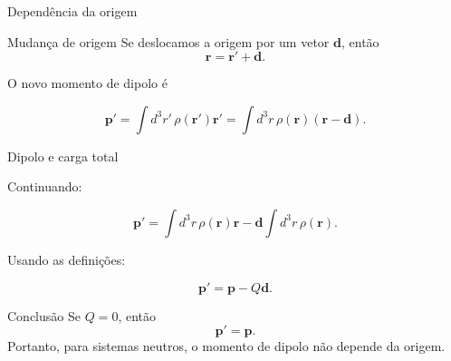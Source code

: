\documentclass[aspectratio=169]{beamer}
\begin{document}
\begin{frame}{Dependência da origem}

\begin{mybox}{Mudança de origem}
Se deslocamos a origem por um vetor \(\mathbf d\), então
\[
\mathbf r = \mathbf r' + \mathbf d.
\]
\end{mybox}

O novo momento de dipolo é

\begin{eqbox}
\begin{equation}
\mathbf p'
=
\int d^3r'\,\rho(\mathbf r')\mathbf r'
=
\int d^3r\,\rho(\mathbf r)(\mathbf r-\mathbf d).
\label{eq:dipolo_origem_1}
\end{equation}
\end{eqbox}

\end{frame}

\begin{frame}{Dipolo e carga total}

Continuando:

\begin{eqbox}
\begin{equation}
\mathbf p'
=
\int d^3r\,\rho(\mathbf r)\mathbf r
-
\mathbf d
\int d^3r\,\rho(\mathbf r).
\label{eq:dipolo_origem_2}
\end{equation}
\end{eqbox}

Usando as definições:

\begin{eqbox}
\begin{equation}
\mathbf p'
=
\mathbf p
-
Q\mathbf d.
\tag{4.9}
\label{eq:dipolo_origem_final}
\end{equation}
\end{eqbox}

\begin{mybox}{Conclusão}
Se \(Q=0\), então
\[
\mathbf p'=\mathbf p.
\]
Portanto, para sistemas neutros, o momento de dipolo não depende da origem.
\end{mybox}

\end{frame}
\end{document}
